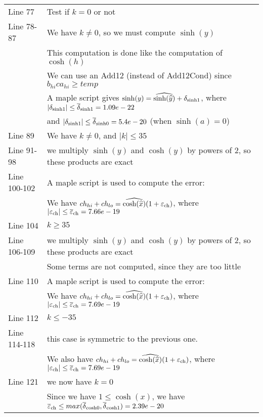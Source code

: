 \begin{tabular}{ll}
Line 77    & Test if $k = 0$ or not \\
Line 78-87 & We have $k \neq 0$, so we must compute $\sinh(y)$ \\
           & This computation is done like the computation of $\cosh(h)$ \\
           & We can use an Add12 (instead of Add12Cond) since $b_{hi}  ca_{hi} \geq  temp$ \\
           & A maple script gives $\sinh(y) = \widehat{\sinh(\widehat{y})} + \delta_{\mathrm{sinh1}}$, where $|\delta_{\mathrm{sinh1}}| \leq  {\overline{\delta}}_{\mathrm{sinh1}} = 1.09e-22$ \\

           & and $|\delta_{\mathrm{sinh1}}| \leq  {\overline{\delta}}_{\mathrm{sinh0}} = 5.4e-20$ (when $\sinh(a) = 0$) \\
Line 89    & We have $k\neq 0$, and $|k| \leq 35$ \\
Line 91-98 & we multiply $\sinh(y)$ and $\cosh(y)$ by powers of 2, so these products are exact \\
Line 100-102 & A maple script is used to compute the error: \\
             & We have $ch_{hi} + ch_{lo} = \widehat{\cosh(\widehat{x})}(1+\varepsilon_{\mathrm{ch}})$, where $|\varepsilon_{\mathrm{ch}}| \leq {\overline{\varepsilon}}_{\mathrm{ch}} = 7.66e-19$ \\
Line 104   & $k \geq 35$ \\
Line 106-109 & we multiply $\sinh(y)$ and $\cosh(y)$ by powers of 2, so these products are exact \\
           & Some terms are not computed, since they are too little \\
Line 110   &  A maple script is used to compute the error: \\
             & We have $ch_{hi} + ch_{lo} = \widehat{\cosh(\widehat{x})}(1+\varepsilon_{\mathrm{ch}})$, where $|\varepsilon_{\mathrm{ch}}| \leq {\overline{\varepsilon}}_{\mathrm{ch}} = 7.69e-19$ \\
Line 112   & $k \leq -35$ \\
Line 114-118 & this case is symmetric to the previous one. \\
           & We also have $ch_{hi} + ch_{lo} = \widehat{\cosh(\widehat{x})}(1+\varepsilon_{\mathrm{ch}})$, where $|\varepsilon_{\mathrm{ch}}| \leq {\overline{\varepsilon}}_{\mathrm{ch}} = 7.69e-19$ \\
Line 121   & we now have $k = 0$ \\
           & Since we have $1 \leq \cosh(x)$, we have  ${\overline{\varepsilon}}_{\mathrm{ch}} \leq max({\overline{\delta}}_{\mathrm{cosh0}},{\overline{\delta}}_{\mathrm{cosh1}}) = 2.39e-20$ \\
\end{tabular}

